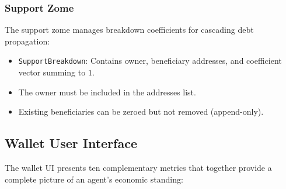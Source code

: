 \documentclass[11pt]{article}
\begin{document}
\subsubsection{Support Zome}

The support zome manages breakdown coefficients for cascading debt propagation:
\begin{itemize}
    \item \texttt{SupportBreakdown}: Contains owner, beneficiary addresses, and coefficient vector summing to $1$.
    \item The owner must be included in the addresses list.
    \item Existing beneficiaries can be zeroed but not removed (append-only).
\end{itemize}

\subsection{Wallet User Interface}

The wallet UI presents ten complementary metrics that together provide a complete picture of an agent's economic standing:
\end{document}

